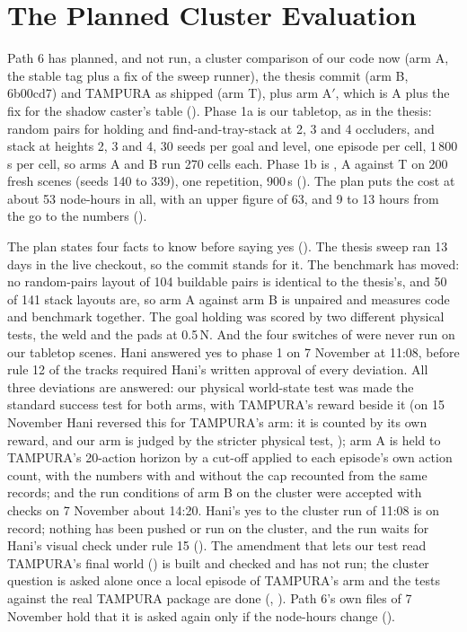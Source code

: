 \section{The Planned Cluster Evaluation}
\label{sec:planned-cluster}

Path 6 has planned, and not run, a cluster comparison of our code now (arm A, the
stable tag plus a fix of the sweep runner), the thesis commit (arm B, 6b00cd7)
and TAMPURA as shipped (arm T), plus arm A$'$, which is A plus the fix for the
shadow caster's table (). Phase 1a is our tabletop, as in the thesis: random
pairs for holding and find-and-tray-stack at 2, 3 and 4 occluders, and stack at
heights 2, 3 and 4, 30 seeds per goal and level, one episode per cell, 1\,800\,s
per cell, so arms A and B run 270 cells each. Phase 1b is \fdice, A against T on 200
fresh scenes (seeds 140 to 339), one repetition, 900\,s (). The plan puts the
cost at about 53 node-hours in all, with an upper figure of 63, and 9 to 13 hours from
the go to the numbers ().

The plan states four facts to know before saying yes (). The thesis sweep ran
13 days in the live checkout, so the commit stands for it. The benchmark has moved:
no random-pairs layout of 104 buildable pairs is identical to the thesis's, and 50
of 141 stack layouts are, so arm A against arm B is unpaired and measures code and
benchmark together. The goal holding was scored by two different physical tests,
the weld and the pads at 0.5\,N. And the four switches of  were never run on
our tabletop scenes. Hani answered yes to phase 1 on 7 November at 11:08, before
rule 12 of the tracks required Hani's written approval of every deviation. All
three deviations are answered: our physical world-state test was made the standard
success test for both arms, with TAMPURA's reward beside it (on 15 November Hani
reversed this for TAMPURA's arm: it is counted by its own reward, and our arm is
judged by the stricter physical test, ); arm A is held to
TAMPURA's 20-action horizon by a cut-off applied to each episode's own action
count, with the numbers with and without the cap recounted from the same records;
and the run conditions of arm B on the cluster were accepted with checks on 7
November about 14:20. Hani's yes to the cluster run of 11:08 is on record;
nothing has been pushed or run on the cluster, and the run waits
for Hani's visual check under rule 15 (). The amendment that lets our test read
TAMPURA's final world () is built and checked and has not run; the cluster
question is asked alone once a local episode of TAMPURA's arm and the tests against the
real TAMPURA package are done (, ). Path 6's own files of 7 November hold that it is asked again only if the node-hours change ().


